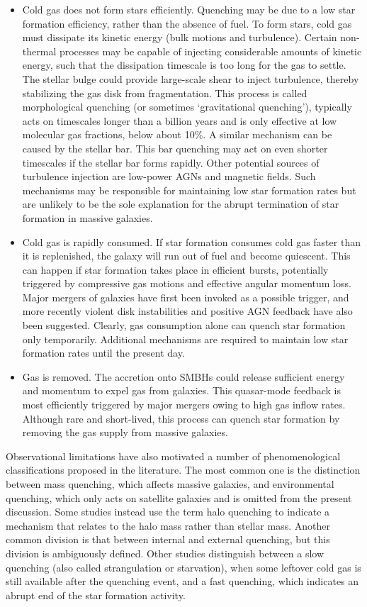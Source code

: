 \documentclass[a4paper,10pt]{article}
\begin{document}
\begin{itemize}
    \item Cold gas does not form stars efficiently. Quenching may be due to a low star formation efficiency, rather than the absence of fuel. To form stars, cold gas must dissipate its kinetic energy (bulk motions and turbulence). Certain non-thermal processes may be capable of injecting considerable amounts of kinetic energy, such that the dissipation timescale is too long for the gas to settle. The stellar bulge could provide large-scale shear to inject turbulence, thereby stabilizing the gas disk from fragmentation. This process is called morphological quenching (or sometimes `gravitational quenching'), typically acts on timescales longer than a billion years and is only effective at low molecular gas fractions, below about 10\%. A similar mechanism can be caused by the stellar bar. This bar quenching may act on even shorter timescales if the stellar bar forms rapidly. Other potential sources of turbulence injection are low-power AGNs and magnetic fields. Such mechanisms may be responsible for maintaining low star formation rates but are unlikely to be the sole explanation for the abrupt termination of star formation in massive galaxies.
    \item Cold gas is rapidly consumed. If star formation consumes cold gas faster than it is replenished, the galaxy will run out of fuel and become quiescent. This can happen if star formation takes place in efficient bursts, potentially triggered by compressive gas motions and effective angular momentum loss. Major mergers of galaxies have first been invoked as a possible trigger, and more recently violent disk instabilities and positive AGN feedback have also been suggested. Clearly, gas consumption alone can quench star formation only temporarily. Additional mechanisms are required to maintain low star formation rates until the present day.
    \item Gas is removed. The accretion onto SMBHs could release sufficient energy and momentum to expel gas from galaxies. This quasar-mode feedback is most efficiently triggered by major mergers owing to high gas inflow rates. Although rare and short-lived, this process can quench star formation by removing the gas supply from massive galaxies.
\end{itemize}

{\noindent}Observational limitations have also motivated a number of phenomenological classifications proposed in the literature. The most common one is the distinction between mass quenching, which affects massive galaxies, and environmental quenching, which only acts on satellite galaxies and is omitted from the present discussion. Some studies instead use the term halo quenching to indicate a mechanism that relates to the halo mass rather than stellar mass. Another common division is that between internal and external quenching, but this division is ambiguously defined. Other studies distinguish between a slow quenching (also called strangulation or starvation), when some leftover cold gas is still available after the quenching event, and a fast quenching, which indicates an abrupt end of the star formation activity.
\end{document}
